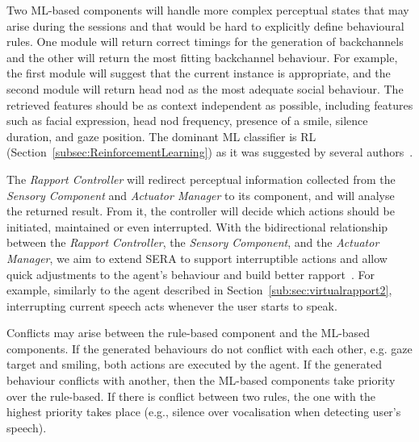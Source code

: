Two \ac{ML}-based components will handle more complex perceptual states that may arise during the sessions and that would be hard to explicitly define behavioural rules. One module will return correct timings for the generation of backchannels and the other will return the most fitting backchannel behaviour. For example, the first module will suggest that the current instance is appropriate, and the second module will return head nod as the most adequate social behaviour. The retrieved features should be as context independent as possible, including features such as facial expression, head nod frequency, presence of a smile, silence duration, and gaze position. The dominant \ac{ML} classifier is \acf{RL} (Section~\ref{subsec:ReinforcementLearning}) as it was suggested by several authors~\cite{Thomaz2006, Kok2012, Zhao2014, Papangelis2014}.

The \textit{Rapport Controller} will redirect perceptual information collected from the \textit{Sensory Component} and \textit{Actuator Manager} to its component, and will analyse the returned result. From it, the controller will decide which actions should be initiated, maintained or even interrupted. With the bidirectional relationship between the \textit{Rapport Controller}, the \textit{Sensory Component}, and the \textit{Actuator Manager}, we aim to extend \ac{SERA} to support interruptible actions and allow quick adjustments to the agent's behaviour and build better rapport~\cite{Reidsma2011, Visser2014, Kopp2007, Zwiers2011}. For example, similarly to the agent described in Section~\ref{sub:sec:virtualrapport2}, interrupting current speech acts whenever the user starts to speak.

Conflicts may arise between the rule-based component and the \ac{ML}-based components. If the generated behaviours do not conflict with each other, e.g. gaze target and smiling, both actions are executed by the agent. If the generated behaviour conflicts with another, then the \ac{ML}-based components take priority over the rule-based. If there is conflict between two rules, the one with the highest priority takes place (e.g., silence over vocalisation when detecting user's speech).